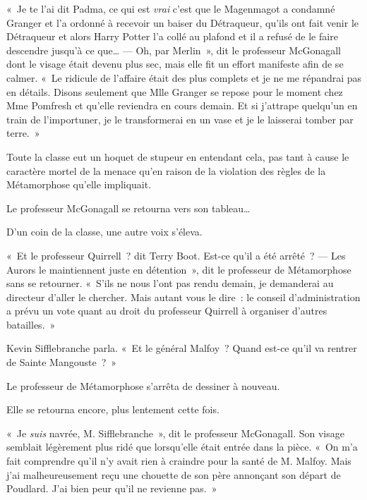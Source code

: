 «~Je te l'ai dit Padma, ce qui est \emph{vrai} c'est que le Magenmagot a condamné Granger et l'a ordonné à recevoir un baiser du Détraqueur, qu'ils ont fait venir le Détraqueur et alors Harry Potter l'a collé au plafond et il a refusé de le faire descendre jusqu'à ce que…
---  Oh, par Merlin~», dit le professeur McGonagall dont le visage était devenu plus sec, mais elle fit un effort manifeste afin de se calmer. «~Le ridicule de l'affaire était des plus complets et je ne me répandrai pas en détails. Disons seulement que Mlle Granger se repose pour le moment chez Mme Pomfresh et qu'elle reviendra en cours demain. Et si j'attrape quelqu'un en train de l'importuner, je le transformerai en un vase et je le laisserai tomber par terre.~»

Toute la classe eut un hoquet de stupeur en entendant cela, pas tant à cause le caractère mortel de la menace qu'en raison de la violation des règles de la Métamorphose qu'elle impliquait.

Le professeur McGonagall se retourna vers son tableau…

D'un coin de la classe, une autre voix s'éleva.

«~Et le professeur Quirrell~? dit Terry Boot. Est-ce qu'il a été arrêté~?
---  Les Aurors le maintiennent juste en détention~», dit le professeur de Métamorphose sans se retourner. «~S'ils ne nous l'ont pas rendu demain, je demanderai au directeur d'aller le chercher. Mais autant vous le dire~: le conseil d'administration a prévu un vote quant au droit du professeur Quirrell à organiser d'autres batailles.~»

Kevin Sifflebranche parla. «~Et le général Malfoy~? Quand est-ce qu'il va rentrer de Sainte Mangouste~?~»

Le professeur de Métamorphose s'arrêta de dessiner à nouveau.

Elle se retourna encore, plus lentement cette fois.

«~Je \emph{suis} navrée, M. Sifflebranche~», dit le professeur McGonagall. Son visage semblait légèrement plus ridé que lorsqu'elle était entrée dans la pièce. «~On m'a fait comprendre qu'il n'y avait rien à craindre pour la santé de M. Malfoy. Mais j'ai malheureusement reçu une chouette de son père annonçant son départ de Poudlard. J'ai bien peur qu'il ne revienne pas.~»
